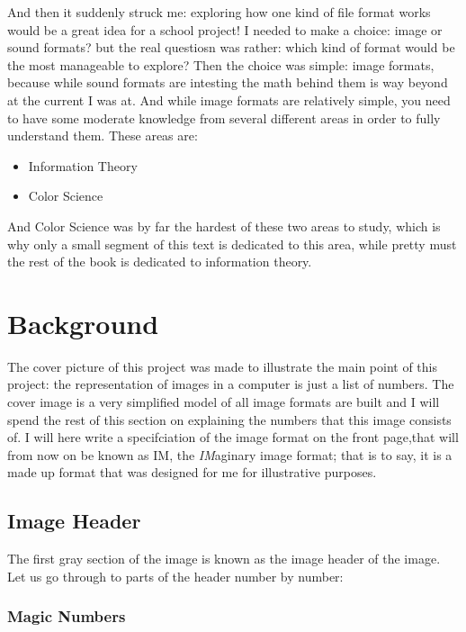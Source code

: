 And then it suddenly struck me: exploring how one kind of file format
works would be a great idea for a school project! I needed to make a
choice: image or sound formats? but the real questiosn was rather:
which kind of format would be the most manageable to explore? Then the
choice was simple: image formats, because while sound formats are
intesting the math behind them is way beyond at the current I was
at. And while image formats are relatively simple, you need to have
some moderate knowledge from several different areas in order to fully
understand them. These areas are:

\begin{itemize}
\item Information Theory
\item Color Science
\end{itemize}

And Color Science was by far the hardest of these two areas to study,
which is why only a small segment of this text is dedicated to this
area, while pretty must the rest of the book is dedicated to information
theory.

\section{Background}

The cover picture of this project was made to illustrate the main
point of this project: the representation of images in a computer is
just a list of numbers. The cover image is a very simplified model of
all image formats are built and I will spend the rest of this section
on explaining the numbers that this image consists of. I will here
write a specifciation of the image format on the front page,that will
from now on be known as IM, the \textit{IM}aginary image format; that
is to say, it is a made up format that was designed for me for
illustrative purposes.

\subsection{Image Header}

The first gray section of the image is known as the image header of
the image. Let us go through to parts of the header number by number:

\subsubsection{Magic Numbers}

